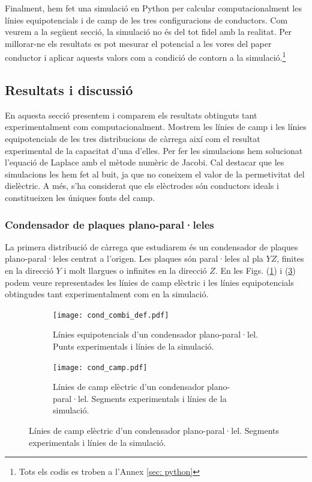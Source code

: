 \documentclass[11pt]{article}
\numberwithin{equation}{section}
\numberwithin{figure}{section}
\numberwithin{table}{section}
\begin{document}
Finalment, hem fet una simulació en Python per calcular computacionalment les línies equipotencials i de camp de les tres configuracions de conductors. Com veurem a la següent secció, la simulació no és del tot fidel amb la realitat. Per millorar-ne els resultats es pot mesurar el potencial a les vores del paper conductor i aplicar aquests valors com a condició de contorn a la simulació.\footnote{\label{nota: codis}Tots els codis es troben a l'Annex \ref{sec: python}}

\subsection{Resultats i discussió}\label{sec: resultats}
En aquesta secció presentem i comparem els resultats obtinguts tant experimentalment com computacionalment. Mostrem les línies de camp i les línies equipotencials de les tres distribucions de càrrega així com el resultat experimental de la capacitat d'una d'elles. Per fer les simulacions hem solucionat l'equació de Laplace amb el mètode numèric de Jacobi\footnotemark[3]. Cal destacar que les simulacions les hem fet al buit, ja que no coneixem el valor de la permetivitat del dielèctric. A més, s'ha considerat que els elèctrodes són conductors ideals i constitueixen les úniques fonts del camp.

\subsubsection{Condensador de plaques plano-paral·leles}\label{sec: cond}
La primera distribució de càrrega que estudiarem és un condensador de plaques plano-paral·leles centrat a l'origen. Les plaques són paral·leles al pla $YZ$, finites en la direcció $Y$ i molt llargues o infinites en la direcció $Z$.
En les Figs. (\ref{fig: cond_pot}) i (\ref{fig: cond_e}) podem veure representades les línies de camp elèctric i les línies equipotencials obtingudes tant experimentalment com en la simulació.   
\begin{figure}[h]
    \centering
    \begin{subfigure}{0.495\textwidth}
        \centering
        \texttt{[image: cond\_combi\_def.pdf]}
        \caption{Línies equipotencials d'un condensador plano-paral·lel. Punts experimentals i línies de la simulació.}
        \label{fig: cond_pot}
    \end{subfigure}
    \begin{subfigure}{0.495\textwidth} 
        \centering
        \texttt{[image: cond\_camp.pdf]}
        \caption{Línies de camp elèctric d'un condensador plano-paral·lel. Segments experimentals i línies de la simulació.}
        \label{fig: cond_e}
    \end{subfigure}
\end{figure}
\end{document}
